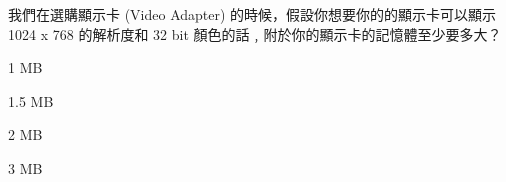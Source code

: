 \ifx\ntpcNinetyTwo\undefined[92學年基北區] \fi
我們在選購顯示卡 (Video Adapter) 的時候，假設你想要你的的顯示卡可以顯示 1024 x 768 的解析度和 32 bit 顏色的話﹐附於你的顯示卡的記憶體至少要多大？
  \begin{optionlist}
  \item 1 MB
  \item 1.5 MB
  \item 2 MB
  \item 3 MB\label{ntpc-92-a29}
  \end{optionlist}